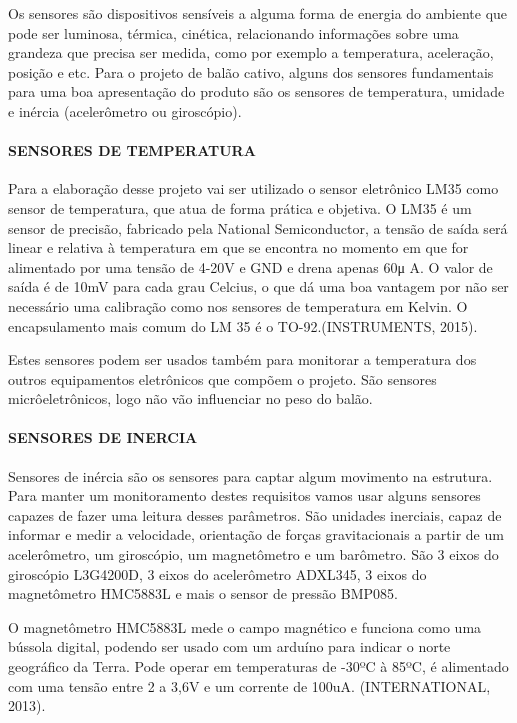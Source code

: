     Os sensores são dispositivos sensíveis a alguma forma de energia do ambiente que pode ser luminosa, térmica, cinética, relacionando informações sobre uma grandeza que precisa ser medida, como por exemplo a temperatura, aceleração, posição e etc.
    Para o projeto de balão cativo, alguns dos sensores fundamentais para uma boa apresentação do produto são os sensores de temperatura, umidade e inércia (acelerômetro ou giroscópio).
    
    \paragraph{SENSORES DE TEMPERATURA}
    Para a elaboração desse projeto vai ser utilizado o sensor eletrônico LM35 como sensor de temperatura, que atua de forma prática e objetiva. O LM35 é um sensor de precisão, fabricado pela National Semiconductor, a tensão de saída será linear e relativa à temperatura em que se encontra no momento em que for alimentado por uma tensão de 4-20V e GND e drena apenas 60μ A. O valor de saída é de 10mV para cada grau Celcius, o que dá uma boa vantagem por não ser necessário uma calibração como nos sensores de temperatura em Kelvin. O encapsulamento mais comum do LM 35 é o TO-92.(INSTRUMENTS, 2015).
    
    Estes sensores podem ser usados também para monitorar a temperatura dos outros equipamentos eletrônicos que compõem o projeto. São sensores micrôeletrônicos, logo não vão influenciar no peso do balão.
    
    \paragraph{SENSORES DE INERCIA}
    Sensores de inércia são os sensores para captar algum movimento na estrutura. Para manter um monitoramento destes requisitos vamos usar alguns sensores capazes de fazer uma leitura desses parâmetros. São unidades inerciais, capaz de informar e medir a velocidade, orientação de forças gravitacionais a partir de um acelerômetro, um giroscópio, um magnetômetro e um barômetro. São 3 eixos do giroscópio L3G4200D, 3 eixos do acelerômetro ADXL345, 3 eixos do magnetômetro HMC5883L e mais o sensor de pressão BMP085.
    
    O magnetômetro HMC5883L mede o campo magnético e funciona como uma bússola digital, podendo ser usado com um arduíno para indicar o norte geográfico da Terra. Pode operar em temperaturas de -30ºC à 85ºC,  é alimentado com uma tensão entre 2 a 3,6V e um corrente de 100uA. (INTERNATIONAL, 2013).
    
